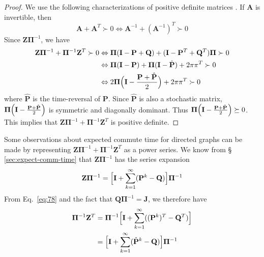 \begin{proof}
  We use the
  following characterizations of positive definite matrices
  \citep[see][\S
  1.2]{boley09:_gener_laplac,horn94:_topic_in_matrix_analy}. If
  $\mathbf{A}$ is invertible, then
  \begin{equation}
    \label{eq:74}
    \mathbf{A} + \mathbf{A}^{T} \succ 0 \Leftrightarrow
    \mathbf{A}^{-1} + (\mathbf{A}^{-1})^{T} \succ 0
  \end{equation}
  Since $\mathbf{Z}\bm{\Pi}^{-1}$, we have
  \begin{equation}
    \label{eq:75}
    \begin{split}
   \mathbf{Z}\bm{\Pi}^{-1} + \bm{\Pi}^{-1}\mathbf{Z}^{T} \succ 0
   & \Leftrightarrow \bm{\Pi}(\mathbf{I} - \mathbf{P} + \mathbf{Q}) +
   (\mathbf{I} - \mathbf{P}^{T} + \mathbf{Q}^{T}) \bm{\Pi} \succ 0  \\
   & \Leftrightarrow \bm{\Pi}(\mathbf{I} - \mathbf{P}) +
   \bm{\Pi}(\mathbf{I} - \hat{\mathbf{P}}) + 2 \pi \pi^{T} \succ 0 \\
   & \Leftrightarrow 2 \bm{\Pi}\Bigl(\mathbf{I} - \frac{\mathbf{P} +
     \hat{\mathbf{P}}}{2}\Bigr) + 2\pi\pi^{T} \succ 0
   \end{split}
  \end{equation}
  where $\hat{\mathbf{P}}$ is the time-reversal of $\mathbf{P}$. Since
  $\hat{\mathbf{P}}$ is also a stochastic matrix,
  $\bm{\Pi}\Bigl(\mathbf{I} - \tfrac{\mathbf{P} +
    \hat{\mathbf{P}}}{2}\Bigr)$ is symmetric and diagonally dominant. Thus
  $\bm{\Pi}\Bigl(\mathbf{I} - \tfrac{\mathbf{P} +
    \hat{\mathbf{P}}}{2}\Bigr) \succeq 0$. This implies that
  $\mathbf{Z}\bm{\Pi}^{-1} + \bm{\Pi}^{-1}\mathbf{Z}^{T}$ is positive
  definite. 
\end{proof}
Some observations about expected commute time for directed graphs can
be made by representing $\mathbf{Z}\bm{\Pi}^{-1} +
\bm{\Pi}^{-1}\mathbf{Z}^{T}$ as a power series. We know from \S
\ref{sec:expect-comm-time} that $\mathbf{Z}\bm{\Pi}^{-1}$ has the
series expansion
\begin{equation*}
  \mathbf{Z}\bm{\Pi}^{-1} = \Bigl[ \mathbf{I} +
  \sum_{k=1}^{\infty}(\mathbf{P}^{k} - \mathbf{Q})\Bigr] \bm{\Pi}^{-1}
\end{equation*}
From Eq.~\eqref{eq:78} and the fact that $\mathbf{Q}\bm{\Pi}^{-1} =
\mathbf{J}$, we therefore have 
\begin{equation*}
  \begin{split}
\bm{\Pi}^{-1} \mathbf{Z}^{T} &= \bm{\Pi}^{-1} \Bigl[ \mathbf{I} +
  \sum_{k=1}^{\infty}((\mathbf{P}^{k})^{T} - \mathbf{Q}^{T})\Bigr] \\
  &= \Bigl[ \mathbf{I} +
  \sum_{k=1}^{\infty}(\hat{\mathbf{P}}^{k} - \mathbf{Q})\Bigr]
  \bm{\Pi}^{-1}
  \end{split}
\end{equation*}
